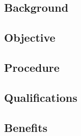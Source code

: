 \documentclass[11pt]{article}
\begin{document}
\subsection*{Background}

\subsection*{Objective}

\subsection*{Procedure}

\subsection*{Qualifications}

\subsection*{Benefits}
\end{document}
